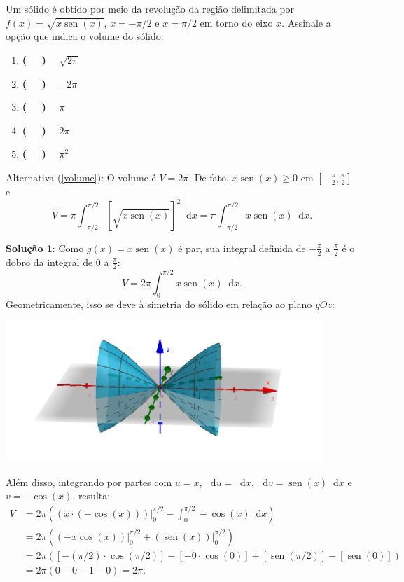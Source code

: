\documentclass[12pt,a4paper]{article}
\newcommand*\diff{\mathop{}\!\mathrm{d}}
\newcommand*\sen{\operatorname{sen}}
\begin{document}
\begin{ExerciseList}
\Exercise[title={2,0}] Um sólido é obtido por meio da revolução da região delimitada por $f(x)=\sqrt{x \sen(x)}$, $x=-\pi/2$ e $x=\pi/2$ em torno do eixo $x$. Assinale a opção que indica o volume do sólido:
\begin{multicols}{5}
\begin{enumerate}
\item {\bf ( \ \ )} \ \ $\sqrt{2\pi}$
\item {\bf ( \ \ )} \ \ $-2\pi$
\item {\bf ( \ \ )} \ \ $\pi$
\item {\bf ( \ \ )} \ \ $2\pi$\label{volume}
\item {\bf ( \ \ )} \ \ $\pi^2$
\end{enumerate}
\end{multicols}
\Answer Alternativa (\ref{volume}): O volume é $V = 2\pi$. De fato, $x \sen(x) \geq 0$ em $[-\frac{\pi}{2}, \frac{\pi}{2}]$ e
\[
    V = \pi \int_{-\pi/2}^{\pi/2} \left[\sqrt{x \sen(x)}\right]^2 \diff{x}
      = \pi \int_{-\pi/2}^{\pi/2} x \sen(x) \diff{x}.
\]

\textbf{Solução 1}: Como $g(x) = x \sen(x)$ é par, sua integral definida de $-\frac{\pi}{2}$ a $\frac{\pi}{2}$ é o dobro da integral de $0$ a $\frac{\pi}{2}$:
\[
    V = 2 \pi \int_{0}^{\pi/2} x \sen(x) \diff{x}.
\]
Geometricamente, isso se deve à simetria do sólido em relação ao plano $yOz$:

\begin{center}
\includegraphics[width=12.0cm]{img/prova-2-nex-sólido-de-revolução.png}
\end{center}


Além disso, integrando por partes com $u=x$, $\diff{u} = \diff{x}$, $\diff{v} = \sen(x) \diff{x}$ e $v = -\cos(x)$, resulta:
\begin{align*}
    V & = 2\pi \left(\left(x \cdot(-\cos(x))\right)\bigg\rvert_{0}^{\pi/2} - \int_{0}^{\pi/2} -\cos(x) \diff{x}\right) \\
      & = 2\pi \left(\left(- x \cos(x) \right)\bigg\rvert_{0}^{\pi/2} + \left(\sen(x) \right)\bigg\rvert_{0}^{\pi/2}\right) \\
      & = 2\pi \left(\left[- (\pi/2) \cdot \cos(\pi/2) \right]-\left[- 0 \cdot \cos(0) \right] + \left[\sen(\pi/2) \right]-\left[\sen(0) \right]\right) \\
      & = 2\pi \left(0 - 0 + 1 - 0\right) = 2\pi.
\end{align*}


\end{ExerciseList}
\end{document}
